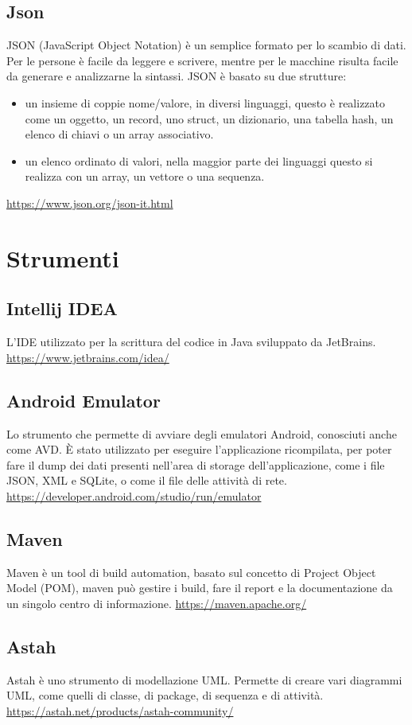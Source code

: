 \subsection*{Json}
JSON (JavaScript Object Notation) è un semplice formato per lo scambio di dati. Per le persone è facile da leggere e scrivere, mentre per le macchine risulta facile da generare e analizzarne la sintassi.
JSON è basato su due strutture:
\begin{itemize}
    \item un insieme di coppie nome/valore, in diversi linguaggi, questo è realizzato come un oggetto, un record, uno struct, un dizionario, una tabella hash, un elenco di chiavi o un array associativo.
    \item un elenco ordinato di valori, nella maggior parte dei linguaggi questo si realizza con un array, un vettore o una sequenza.
\end{itemize}
\url{https://www.json.org/json-it.html}
\section{Strumenti}\label{sec:strumenti}

\subsection*{Intellij IDEA}
L'IDE utilizzato per la scrittura del codice in Java sviluppato da JetBrains.
\url{https://www.jetbrains.com/idea/}

\subsection*{Android Emulator}
Lo strumento che permette di avviare degli emulatori Android, conosciuti anche come AVD. È stato utilizzato per eseguire l'applicazione ricompilata, per poter fare il dump dei dati presenti nell'area di storage dell'applicazione, come i file JSON, XML e SQLite, o come il file delle attività di rete.
\url{https://developer.android.com/studio/run/emulator}

\subsection*{Maven}
Maven è un tool di build automation, basato sul concetto di Project Object Model (POM), maven può gestire i build, fare il report e la documentazione da un singolo centro di informazione.
\url{https://maven.apache.org/}

\subsection*{Astah}
Astah è uno strumento di modellazione UML. Permette di creare vari diagrammi UML, come quelli di classe, di package, di sequenza e di attività.
\url{https://astah.net/products/astah-community/}

